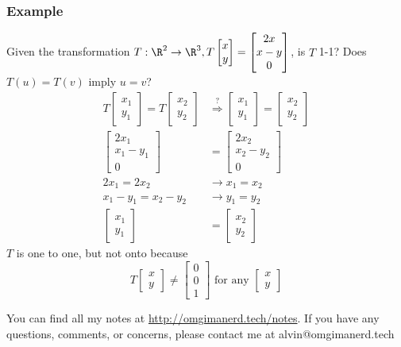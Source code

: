 \documentclass{math}
\begin{document}
\subsubsection*{Example}
Given the transformation \( T:\R^2\to\R^3, T\begin{bmatrix}x \\ y\end{bmatrix}
= \begin{bmatrix}2x \\ x-y \\ 0\end{bmatrix} \), is \( T \) 1-1? Does
\( T(u) = T(v) \) imply \( u = v \)?
\begin{align*}
  T\begin{bmatrix}x_1 \\ y_1\end{bmatrix} =
    T\begin{bmatrix}x_2 \\ y_2\end{bmatrix} &\stackrel{?}{\Rightarrow}
    \begin{bmatrix}x_1 \\ y_1\end{bmatrix} =
    \begin{bmatrix}x_2 \\ y_2\end{bmatrix} \\
  \begin{bmatrix}2x_1 \\ x_1-y_1 \\ 0\end{bmatrix} &=
    \begin{bmatrix}2x_2 \\ x_2-y_2 \\ 0\end{bmatrix} \\
  2x_1 = 2x_2 &\to x_1 = x_2 \\
  x_1-y_1 = x_2-y_2 &\to y_1 = y_2 \\
  \begin{bmatrix}x_1 \\ y_1\end{bmatrix} &=
    \begin{bmatrix}x_2 \\ y_2\end{bmatrix}
\end{align*}
\( T \) is one to one, but not onto because
\[ T\begin{bmatrix}x \\ y\end{bmatrix} \ne \begin{bmatrix}0 \\ 0 \\ 1
\end{bmatrix} \text{ for any } \begin{bmatrix}x \\ y\end{bmatrix} \]

\begin{center}
  You can find all my notes at \url{http://omgimanerd.tech/notes}. If you have
  any questions, comments, or concerns, please contact me at
  alvin@omgimanerd.tech
\end{center}
\end{document}
